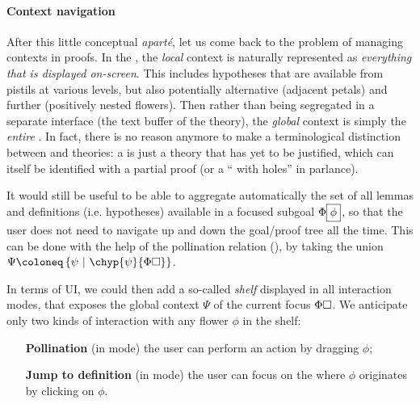 \paragraph{Context navigation}

After this little conceptual \textit{aparté}, let us come back to the problem of
managing contexts in proofs. In the , the \emph{local} context is
naturally represented as \emph{everything that is displayed on-screen}. This
includes hypotheses that are available from pistils at various levels, but also
potentially alternative  (adjacent petals) and further  (positively
nested flowers). Then rather than being segregated in a separate interface (the
text buffer of the theory), the \emph{global} context is simply the
\emph{entire} . In fact, there is no reason anymore to make a terminological
distinction between  and theories: a  is just a theory that has yet to
be justified, which can itself be identified with a partial proof (or a `` with holes'' in  parlance).

It would still be useful to be able to aggregate automatically the set of all
lemmas and definitions (i.e. hypotheses) available in a focused subgoal
$\Phi\fbox{$\phi$}$, so that the user does not need to navigate up and down the
goal/proof tree all the time. This can be done with the help of the pollination
relation (), by taking the union $\Psi \deq
\compr{\psi}{\chyp{\psi}{\Phi\hole}}$.

In terms of UI, we could then add a so-called \emph{shelf} displayed in all
interaction modes, that exposes the global context $\Psi$ of the current focus
$\Phi\square$. We anticipate only two kinds of interaction with any flower $\phi$
in the shelf:
\begin{itemize}
  \item[\textbf{Pollination} (in \Proof mode)] the user can perform an
   action by dragging $\phi$;
  \item[\textbf{Jump to definition} (in \Navigation mode)] the user can focus on
  the  where $\phi$ originates by clicking on $\phi$.
\end{itemize}


